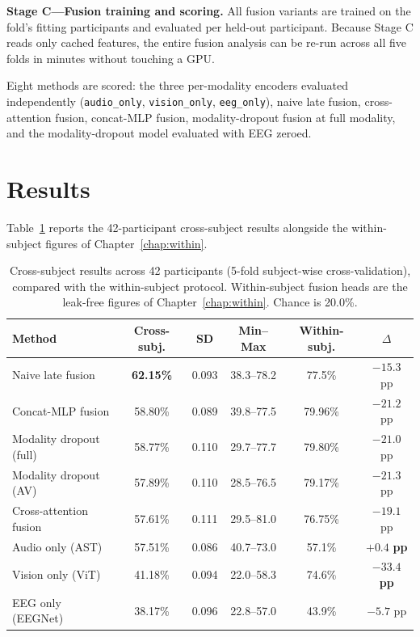 \textbf{Stage C---Fusion training and scoring.} All fusion variants are trained on the
fold's fitting participants and evaluated per held-out participant. Because Stage C
reads only cached features, the entire fusion analysis can be re-run across all five
folds in minutes without touching a GPU.

Eight methods are scored: the three per-modality encoders evaluated independently
(\texttt{audio\_only}, \texttt{vision\_only}, \texttt{eeg\_only}), naive late fusion,
cross-attention fusion, concat-MLP fusion, modality-dropout fusion at full modality,
and the modality-dropout model evaluated with EEG zeroed.

\section{Results}
\label{sec:cs_results}

Table~\ref{tab:cs_main} reports the 42-participant cross-subject results alongside
the within-subject figures of Chapter~\ref{chap:within}.

\begin{table}[htbp]
\centering
\caption{Cross-subject results across 42 participants (5-fold subject-wise
cross-validation), compared with the within-subject protocol. Within-subject fusion
heads are the leak-free figures of Chapter~\ref{chap:within}. Chance is 20.0\%.}
\label{tab:cs_main}
\begin{tabular}{lccccc}
\hline
\textbf{Method} & \textbf{Cross-subj.} & \textbf{SD} & \textbf{Min--Max} & \textbf{Within-subj.} & \textbf{$\Delta$} \\
\hline
Naive late fusion      & \textbf{62.15\%} & 0.093 & 38.3--78.2 & 77.5\% & $-15.3$ pp \\
Concat-MLP fusion      & 58.80\% & 0.089 & 39.8--77.5 & 79.96\% & $-21.2$ pp \\
Modality dropout (full)& 58.77\% & 0.110 & 29.7--77.7 & 79.80\% & $-21.0$ pp \\
Modality dropout (AV)  & 57.89\% & 0.110 & 28.5--76.5 & 79.17\% & $-21.3$ pp \\
Cross-attention fusion & 57.61\% & 0.111 & 29.5--81.0 & 76.75\% & $-19.1$ pp \\
Audio only (AST)       & 57.51\% & 0.086 & 40.7--73.0 & 57.1\% & $\mathbf{+0.4}$ \textbf{pp} \\
Vision only (ViT)      & 41.18\% & 0.094 & 22.0--58.3 & 74.6\% & $\mathbf{-33.4}$ \textbf{pp} \\
EEG only (EEGNet)      & 38.17\% & 0.096 & 22.8--57.0 & 43.9\% & $-5.7$ pp \\
\hline
\end{tabular}
\end{table}

